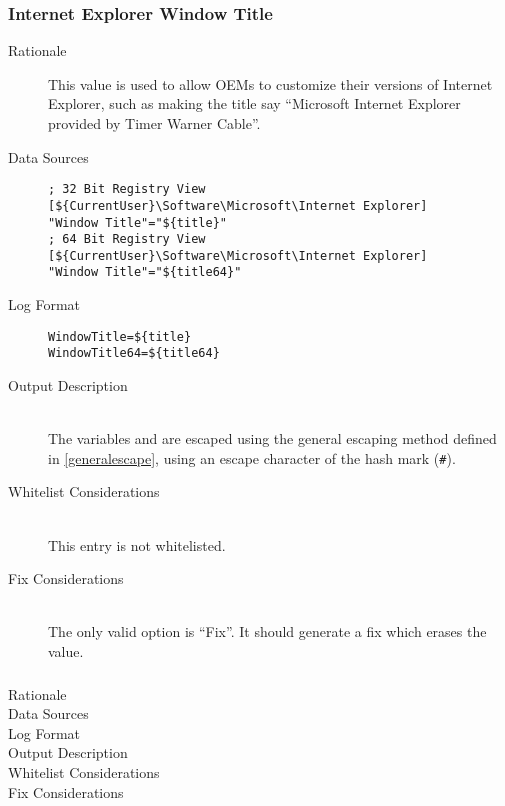 \subsubsection{Internet Explorer Window Title}
\begin{description}
\item[Rationale] This value is used to allow OEMs to customize their versions of
Internet Explorer, such as making the title say ``Microsoft Internet Explorer
provided by Timer Warner Cable''.

\item[Data Sources] \hfill
\vspace{-\baselineskip}
\begin{verbatim}
; 32 Bit Registry View
[${CurrentUser}\Software\Microsoft\Internet Explorer]
"Window Title"="${title}"
; 64 Bit Registry View
[${CurrentUser}\Software\Microsoft\Internet Explorer]
"Window Title"="${title64}"
\end{verbatim}
\item[Log Format] \hfill
\vspace{-\baselineskip}
\begin{verbatim} 
WindowTitle=${title}
WindowTitle64=${title64}
\end{verbatim}
\item[Output Description] \hfill \\
The variables  and  are escaped using the general
escaping method defined in \ref{generalescape}, using an escape character of
the hash mark (\verb|#|).
\item[Whitelist Considerations] \hfill \\
This entry is not whitelisted.
\item[Fix Considerations] \hfill \\
The only valid option is ``Fix''. It should generate a fix which erases the
value.
\end{description}

\subsubsection{}
\begin{description}
\item[Rationale]
\item[Data Sources]
\item[Log Format]
\item[Output Description]
\item[Whitelist Considerations]
\item[Fix Considerations]
\end{description}


